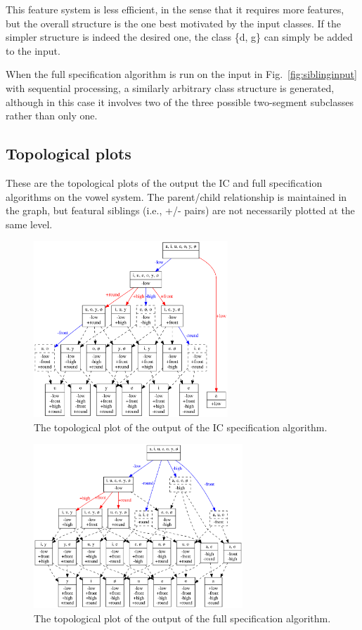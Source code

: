 \documentclass[12pt, oneside]{article}   	%
\begin{document}
This feature system is less efficient, in the sense that it requires more features, but the overall structure is the one best motivated by the input classes. If the simpler structure is indeed the desired one, the class \{d, g\} can simply be added to the input.

When the full specification algorithm is run on the input in Fig.~\ref{fig:siblinginput} with sequential processing, a similarly arbitrary class structure is generated, although in this case it involves two of the three possible two-segment subclasses rather than only one.

\subsection{Topological plots}
\label{app:topological}

These are the topological plots of the output the IC and full specification algorithms on the vowel system. The parent/child relationship is maintained in the graph, but featural siblings (i.e., +/- pairs) are not necessarily plotted at the same level.

\begin{figure}[htb!]
	\centering
	\includegraphics[width=0.65\textwidth]{vowel_inventory_ic_TOPOLOGICAL.png}
	\caption{The topological plot of the output of the IC specification algorithm.}
	\label{fig:vowel_inventory_ic_topological}
\end{figure}

\begin{figure}[htb!]
\centering
\includegraphics[width=0.7\textwidth]{vowel_inventory_full_TOPOLOGICAL.png}
\caption{The topological plot of the output of the full specification algorithm.}
\label{fig:vowelfulltopological}
\end{figure}




\end{document}
